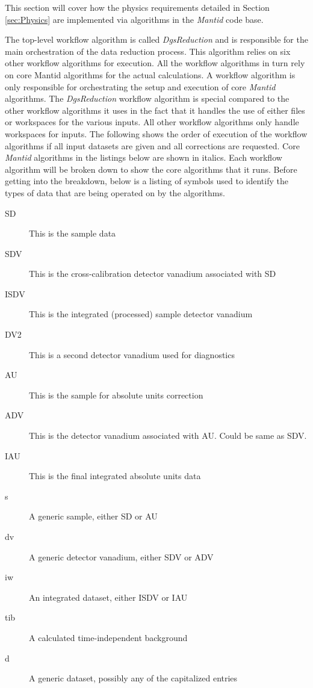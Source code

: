 This section will cover how the physics requirements detailed in Section \ref{sec:Physics} are implemented via algorithms in the \textit{Mantid} code base.

The top-level workflow algorithm is called \textit{DgsReduction} and is responsible for the main orchestration of the data reduction process. This algorithm relies on six other workflow algorithms for execution. All the workflow algorithms in turn rely on core Mantid algorithms for the actual calculations. A workflow algorithm is only responsible for orchestrating the setup and execution of core \textit{Mantid} algorithms. The \textit{DgsReduction} workflow algorithm is special compared to the other workflow algorithms it uses in the fact that it handles the use of either files or workspaces for the various inputs. All other workflow algorithms only handle workspaces for inputs. The following shows the order of execution of the workflow algorithms if all input datasets are given and all corrections are requested. Core \textit{Mantid} algorithms in the listings below are shown in italics. Each workflow algorithm will be broken down to show the core algorithms that it runs. Before getting into the breakdown, below is a listing of symbols used to identify the types of data that are being operated on by the algorithms.

\begin{description}
\item[SD] This is the sample data
\item[SDV] This is the cross-calibration detector vanadium associated with SD
\item[ISDV] This is the integrated (processed) sample detector vanadium
\item[DV2] This is a second detector vanadium used for diagnostics
\item[AU] This is the sample for absolute units correction
\item[ADV] This is the detector vanadium associated with AU. Could be same as SDV.
\item[IAU] This is the final integrated absolute units data
\item[s] A generic sample, either SD or AU
\item[dv] A generic detector vanadium, either SDV or ADV
\item[iw] An integrated dataset, either ISDV or IAU
\item[tib] A calculated time-independent background
\item[d] A generic dataset, possibly any of the capitalized entries
\end{description}

